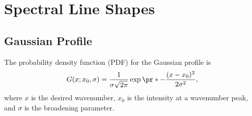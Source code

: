 \documentclass[11pt, twoside, fleqn]{report}
\begin{document}
\pagestyle{empty}


\tableofcontents
\newpage
\listoffigures
\newpage
\listoftables
\newpage

\pagestyle{mystyle}







\chapter{Spectral Line Shapes}
\label{c:spectral_line_shapes}

\section{Gaussian Profile}
\label{s:gaussian_profile}

The probability density function (PDF) for the Gaussian profile is
\begin{equation*}
    G(x; x_0, \sigma) = \frac{1}{\sigma\sqrt{2\pi}}\exp\pr*{-\frac{(x - x_0)^2}{2\sigma^2}},
\end{equation*}
where $x$ is the desired wavenumber, $x_0$ is the intensity at a wavenumber peak, and $\sigma$ is the broadening parameter.
\end{document}
